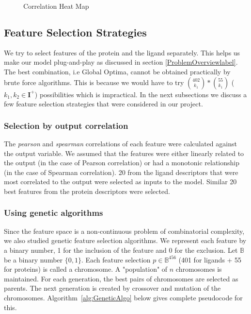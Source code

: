 \documentclass[11pt]{article}
\begin{document}
\begin{figure}[htb]
\begin{subfigure}[b]{0.45\textwidth}
        \label{fig:correlationfr}
     \end{subfigure}
     \caption{Correlation Heat Map}
     \label{fig:correlationheatmap}
\end{figure}

\subsection{Feature Selection Strategies}


We try to select features of the protein and the ligand separately.
This helps us make our model plug-and-play as discussed in section \ref{ProblemOverviewlabel}.
The best combination,  i.e Global Optima,  cannot be obtained practically by brute force algorithms.
This is because we would have to try $\binom{402}{k_1} * \binom{55}{k_1}$ ($k_1, k_2 \in \mathbf{I}^+$) possibilities which is impractical.
In the next subsections we discuss a few feature selection strategies that were considered in our project.

\subsubsection{Selection by output correlation}
The \textit{pearson} and \textit{spearman} correlations of each feature were calculated against the output variable.
We assumed that the features were either linearly related to the output (in the case of Pearson correlation) or had a monotonic relationship (in the case of Spearman correlation).
20 from the ligand descriptors that were most correlated to the output were selected as inputs to the model.  Similar 20 best features from the protein descriptors were selected.

\subsubsection{Using genetic algorithms \cite{genetic_algorithm}}
Since the feature space is a non-continuous problem of combinatorial complexity,
we also studied genetic feature selection algorithms.
We represent each feature by a binary number, 1 for the inclusion of the feature and 0 for the exclusion.
Let $\mathbb{B}$ be a binary number $\{0,  1\}$.
Each feature selection $p \in \mathbb{B}^{456}$ (401 for ligands + 55 for proteins) is called a chromosome.
A "population" of $n$ chromosomes is maintained.
For each generation,  the best pairs of chromosomes are selected as parents.
The next generation is created by crossover and mutation of the chromosomes.
Algorithm~\ref{alg:GeneticAlgo} below gives complete pseudocode for this.
\end{document}
